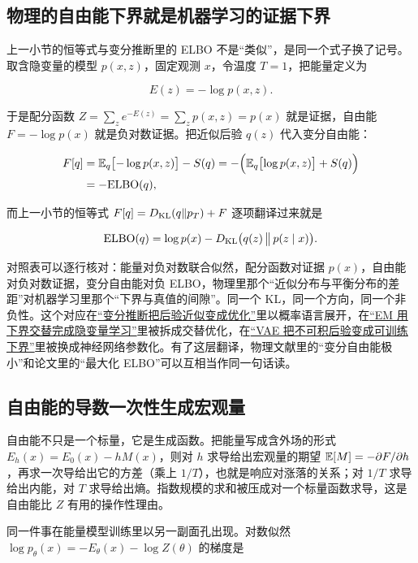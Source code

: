 \subsection{物理的自由能下界就是机器学习的证据下界}

上一小节的恒等式与变分推断里的 ELBO 不是``类似''，是同一个式子换了记号。取含隐变量的模型 \(p(x,z)\)，固定观测 \(x\)，令温度 \(T=1\)，把能量定义为

\[
E(z)=-\log p(x,z).
\]

于是配分函数 \(Z=\sum_z e^{-E(z)}=\sum_z p(x,z)=p(x)\) 就是证据，自由能 \(F=-\log p(x)\) 就是负对数证据。把近似后验 \(q(z)\) 代入变分自由能：

\[
\begin{aligned}
F[q]&=\mathbb{E}_q\bigl[-\log p(x,z)\bigr]-S(q)
=-\Bigl(\mathbb{E}_q\bigl[\log p(x,z)\bigr]+S(q)\Bigr)\\
&=-\mathrm{ELBO}(q),
\end{aligned}
\]

而上一小节的恒等式 \(F[q]=D_{\mathrm{KL}}(q\|p_T)+F\) 逐项翻译过来就是

\[
\mathrm{ELBO}(q)=\log p(x)-D_{\mathrm{KL}}\bigl(q(z)\,\big\|\,p(z\mid x)\bigr).
\]

对照表可以逐行核对：能量对负对数联合似然，配分函数对证据 \(p(x)\)，自由能对负对数证据，变分自由能对负 ELBO，物理里那个``近似分布与平衡分布的差距''对机器学习里那个``下界与真值的间隙''。同一个 KL，同一个方向，同一个非负性。这个对应在\hyperref[sec:13-Machine-Learning/08-Sampling-and-Inference/03]{``变分推断把后验近似变成优化''}里以概率语言展开，在\hyperref[sec:13-Machine-Learning/06-Probabilistic-Models/04]{``EM 用下界交替完成隐变量学习''}里被拆成交替优化，在\hyperref[sec:14-Deep-Learning/06-Variational-Autoencoders/01]{``VAE 把不可积后验变成可训练下界''}里被换成神经网络参数化。有了这层翻译，物理文献里的``变分自由能极小''和论文里的``最大化 ELBO''可以互相当作同一句话读。

\subsection{自由能的导数一次性生成宏观量}

自由能不只是一个标量，它是生成函数。把能量写成含外场的形式 \(E_h(x)=E_0(x)-hM(x)\)，则对 \(h\) 求导给出宏观量的期望 \(\mathbb{E}[M]=-\partial F/\partial h\)，再求一次导给出它的方差（乘上 \(1/T\)），也就是响应对涨落的关系；对 \(1/T\) 求导给出内能，对 \(T\) 求导给出熵。指数规模的求和被压成对一个标量函数求导，这是自由能比 \(Z\) 有用的操作性理由。

同一件事在能量模型训练里以另一副面孔出现。对数似然 \(\log p_\theta(x)=-E_\theta(x)-\log Z(\theta)\) 的梯度是

